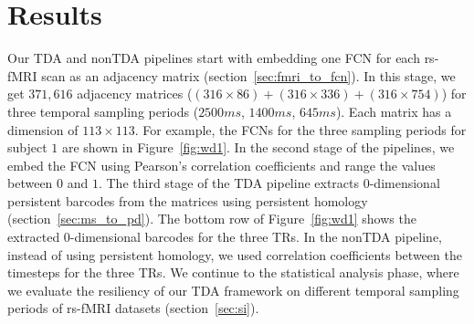 \section{Results}
\label{sec:eval}
Our TDA and nonTDA pipelines start with embedding one FCN for each rs-fMRI scan as an adjacency matrix (section~\ref{sec:fmri_to_fcn}). In this stage, we get $371,616$ adjacency matrices ($(316 \times 86) + (316 \times 336) + (316 \times 754)$) for three temporal sampling periods ($2500ms$, $1400ms$, $645ms$). Each matrix has a dimension of $113 \times 113$. For example, the FCNs for the three sampling periods for subject $1$ are shown in Figure~\ref{fig:wd1}. In the second stage of the pipelines, we embed the FCN using Pearson's correlation coefficients and range the values between $0$ and $1$. The third stage of the TDA pipeline extracts 0-dimensional persistent barcodes from the matrices using persistent homology (section~\ref{sec:ms_to_pd}). The bottom row of Figure~\ref{fig:wd1} shows the extracted 0-dimensional barcodes for the three TRs. In the nonTDA pipeline, instead of using persistent homology, we used correlation coefficients between the timesteps for the three TRs. We continue to the statistical analysis phase, where we evaluate the resiliency of our TDA framework on different temporal sampling periods of rs-fMRI datasets (section~\ref{sec:si}).


